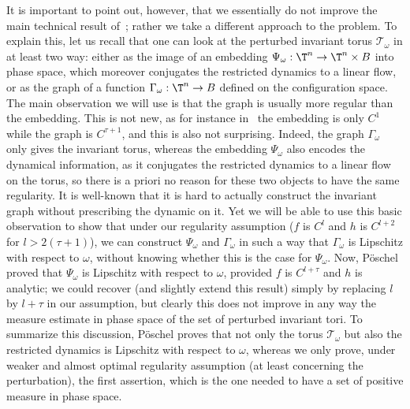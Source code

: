 It is important to point out, however, that we essentially do not improve the main technical result of~\cite{Pos82}; rather we take a different approach to the problem. To explain this, let us recall that one can look at the perturbed invariant torus $\mathcal{T}_\omega$ in at least two way: either as the image of an embedding $\Psi_\omega : \T^n \to \T^n \times B$ into phase space, which moreover conjugates the restricted dynamics to a linear flow, or as the graph of a function $\Gamma_\omega : \T^n \to B$ defined on the configuration space. The main observation we will use is that the graph is usually more regular than the embedding. This is not new, as for instance in~\cite{Sal04} the embedding is only $C^1$ while the graph is $C^{\tau+1}$, and this is also not surprising. Indeed, the graph $\Gamma_\omega$ only gives the invariant torus, whereas the embedding $\Psi_\omega$ also encodes the dynamical information, as it conjugates the restricted dynamics to a linear flow on the torus, so there is a priori no reason for these two objects to have the same regularity. It is well-known that it is hard to actually construct the invariant graph without prescribing the dynamic on it. Yet we will be able to use this basic observation to show that under our regularity assumption ($f$ is $C^l$ and $h$ is $C^{l+2}$ for $l>2(\tau+1)$), we can construct $\Psi_\omega$ and $\Gamma_\omega$ in such a way that $\Gamma_\omega$ is Lipschitz with respect to $\omega$, without knowing whether this is the case for $\Psi_\omega$. Now, Pöschel proved that $\Psi_\omega$ is Lipschitz with respect to $\omega$, provided $f$ is $C^{l+\tau}$ and $h$ is analytic; we could recover (and slightly extend this result) simply by replacing $l$ by $l+\tau$ in our assumption, but clearly this does not improve in any way the measure estimate in phase space of the set of perturbed invariant tori. To summarize this discussion, Pöschel proves that not only the torus $\mathcal{T}_\omega$ but also the restricted dynamics is Lipschitz with respect to $\omega$, whereas we only prove, under weaker and almost optimal regularity assumption (at least concerning the perturbation), the first assertion, which is the one needed to have a set of positive measure in phase space.

